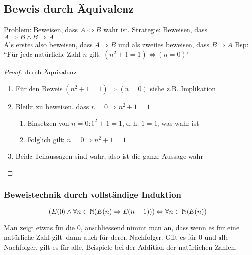 \subsection{Beweis durch Äquivalenz}
Problem: Beweisen, dass $A \Leftrightarrow B$ wahr ist.
Strategie: Beweisen, dass $A \Rightarrow B \wedge B \Rightarrow A$\\
Als erstes also beweisen, dass $A \Rightarrow B$ und als zweites
beweisen, dass $B \Rightarrow A$
Bsp: \enquote{Für jede natürliche Zahl $n$ gilt: $(n^2 + 1 = 1) \Leftrightarrow (n = 0)$}\\
\begin{proof}
	durch Äquivalenz
\begin{enumerate}\itemsep0em
	\item Für den Beweis $(n^2 + 1 = 1) \Rightarrow (n = 0)$ siehe z.B. Implikation
	\item Bleibt zu beweisen, dass $n = 0 \Rightarrow n^2 + 1 = 1$
	\begin{enumerate}\itemsep0em
		\item Einsetzen von $n = 0: 0^2 + 1 = 1$, d.\,h. $1 = 1$, was wahr ist
		\item Folglich gilt: $n = 0 \Rightarrow n^2 + 1 = 1$ 
	\end{enumerate}
	\item Beide Teilaussagen sind wahr, also ist die ganze Aussage wahr\qedhere
\end{enumerate}
\end{proof}

\subsubsection{Beweistechnik durch vollständige Induktion}
\begin{equation*}
(E(0)
\wedge \forall n \in \mathbb{N} (E(n) \Rightarrow E(n + 1)))
\Leftrightarrow \forall n \in \mathbb{N} (E(n))
\end{equation*}

Man zeigt etwas für die 0, anschliessend nimmt man an, dass wenn es für eine
natürliche Zahl gilt, dann auch für deren Nachfolger. Gilt es für 0 und alle Nachfolger, gilt es für alle.
Beispiele bei der Addition der natürlichen Zahlen.